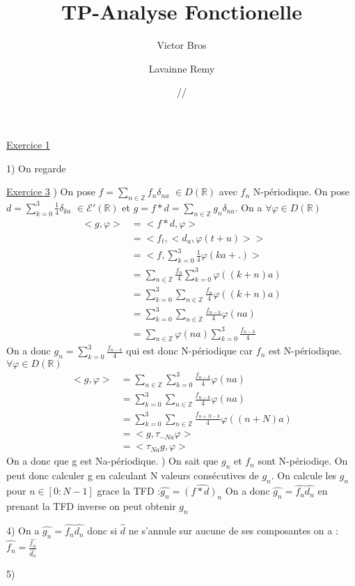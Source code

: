 \documentclass[a4paper,11pt]{article}
\title{\textbf{TP-Analyse Fonctionelle}}
\author{Victor Bros \and Lavainne Remy}
\date{\oldstylenums{07}/\oldstylenums{11}/\oldstylenums{2018}}
\begin{document}
\maketitle
\underline{Exercice 1}

1) On regarde

\underline{Exercice 3}
) On pose $\displaystyle f= \sum_{n \in \mathbb{Z}} f_n \delta_{na} \,\, \in D(\mathbb{R})$ avec $f_n$ N-périodique.
On pose $\displaystyle d = \sum_{k=0}^{3} \frac{1}{4}\delta_{ka} \,\, \in \mathcal{E}'(\mathbb{R})$ et
$\displaystyle g = f \ast d = \sum_{n \in \mathbb{Z}} g_n \delta_{na}$.
\newline
On a $\displaystyle \forall \varphi \in D(\mathbb{R})$ 
\begin{equation}
    \begin{aligned}
        <g,\varphi> &= <f\ast d, \varphi> \\
                    &= <f_{t},<d_{u},\varphi(t+u)>>\\
                    &= <f, \displaystyle{\sum_{k=0}^3 \frac{1}{4} \varphi(ka+.)}>\\
                    &= \displaystyle{\sum_{n \in \mathbb{Z}} \frac{f_n}{4} \sum_{k=0}^{3} \varphi((k+n)a)}\\
                    &=\displaystyle{\sum_{k=0}^{3} \sum_{n \in \mathbb{Z}} \frac{f_n}{4} \varphi((k+n)a)}\\
                    &=\displaystyle{\sum_{k=0}^{3} \sum_{n \in \mathbb{Z}} \frac{f_{n-k}}{4} \varphi(na)}\\
                    &=\displaystyle{\sum_{n \in \mathbb{Z}} \varphi(na) \sum_{k=0}^{3} \frac{f_{n-k}}{4}}
    \end{aligned}
\end{equation}
On a donc $\displaystyle g_n = \sum_{k=0}^{3} \frac{f_{n-k}}{4}$ qui est donc N-périodique car $f_n$ est N-périodique.
\newline
$\forall \varphi \in D(\mathbb{R})$
\begin{equation}
    \begin{aligned}
        <g,\varphi> &= \displaystyle{\sum_{n \in \mathbb{Z}} \sum_{k=0}^{3} \frac{f_{n-k}}{4} \varphi(na)}\\
                    &= \displaystyle{\sum_{k=0}^{3} \sum_{n \in \mathbb{Z}} \frac{f_{n-k}}{4} \varphi(na)}\\
                    &= \displaystyle{\sum_{k=0}^{3} \sum_{n \in \mathbb{Z}} \frac{f_{n+N-k}}{4} \varphi((n+N)a)}\\
                    &= <g, \tau_{-Na}\varphi>\\
                    &= <\tau_{Na}g,\varphi>
    \end{aligned}
\end{equation}
On a donc que g est Na-périodique.
) On sait que $g_n$ et $f_n$ sont N-périodiqe. On peut donc calculer g en calculant N valeurs consécutives de $g_n$.
On calcule les $g_n$ pour $ n \in \left[ 0:N-1 \right]$ grace  la TFD :$\widehat{g_n} = \widehat{(f * d)_n}$
On a donc $\widehat{g_n} = \widehat{f_n}\widehat{d_n}$ en prenant la TFD inverse on peut obtenir $g_n$ 


4) On a $\widehat{g_n} = \widehat{f_n}\widehat{d_n}$ donc si $\widehat{d}$ ne s'annule sur aucune de ses composantes
on a : $\widehat{f_n} = \frac{\widehat{f_n}}{\widehat{d_n}}$

5) 
\end{document}
